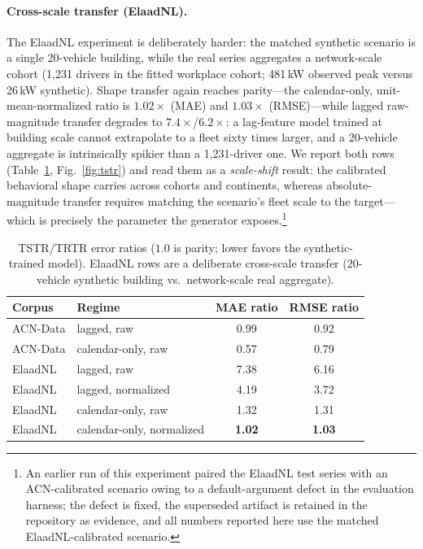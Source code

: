 \paragraph{Cross-scale transfer (ElaadNL).}
The ElaadNL experiment is deliberately harder: the matched synthetic scenario
is a single 20-vehicle building, while the real series aggregates a
network-scale cohort (1{,}231 drivers in the fitted workplace cohort;
481\,kW observed peak versus 26\,kW synthetic). Shape transfer again reaches parity---the
calendar-only, unit-mean-normalized ratio is $1.02\times$ (MAE) and
$1.03\times$ (RMSE)---while lagged raw-magnitude transfer degrades to
$7.4\times$/$6.2\times$: a lag-feature model trained at building scale cannot
extrapolate to a fleet sixty times larger, and a 20-vehicle aggregate is
intrinsically spikier than a 1{,}231-driver one. We report both
rows (Table~\ref{tab:tstr}, Fig.~\ref{fig:tstr}) and read them as a
\emph{scale-shift} result: the
calibrated behavioral shape carries across cohorts and continents, whereas
absolute-magnitude transfer requires matching the scenario's fleet scale to
the target---which is precisely the parameter the generator exposes.\footnote{
An earlier run of this experiment paired the ElaadNL test series with an
ACN-calibrated scenario owing to a default-argument defect in the evaluation
harness; the defect is fixed, the superseded artifact is retained in the
repository as evidence, and all numbers reported here use the matched
ElaadNL-calibrated scenario.}

\begin{table}[t]
\caption{TSTR/TRTR error ratios ($1.0$ is parity; lower favors the
synthetic-trained model). ElaadNL rows are a deliberate cross-scale transfer
(20-vehicle synthetic building vs.\ network-scale real aggregate).}
\label{tab:tstr}
\centering\small
\begin{tabular}{@{}llcc@{}}
\toprule
Corpus & Regime & MAE ratio & RMSE ratio \\
\midrule
ACN-Data & lagged, raw & 0.99 & 0.92 \\
ACN-Data & calendar-only, raw & 0.57 & 0.79 \\
ElaadNL & lagged, raw & 7.38 & 6.16 \\
ElaadNL & lagged, normalized & 4.19 & 3.72 \\
ElaadNL & calendar-only, raw & 1.32 & 1.31 \\
ElaadNL & calendar-only, normalized & \textbf{1.02} & \textbf{1.03} \\
\bottomrule
\end{tabular}
\end{table}


